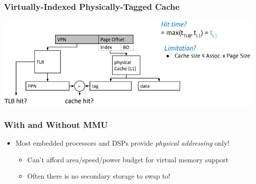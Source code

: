 \documentclass[10pt]{article}
\begin{document}
\subsubsection*{Virtually-Indexed Physically-Tagged Cache}
\begin{center}
    \includegraphics*[scale=0.8]{W7_18.png}
\end{center}    
\subsubsection*{With and Without MMU}
\begin{itemize}
    \item Most embedded processors and DSPs provide \textit{physical addressing} only!
    \begin{itemize}
        \item Can't afford area/speed/power budget for virtual memory support
        \item Often there is no secondary storage to swap to!
    \end{itemize}
\end{itemize}
\end{document}
